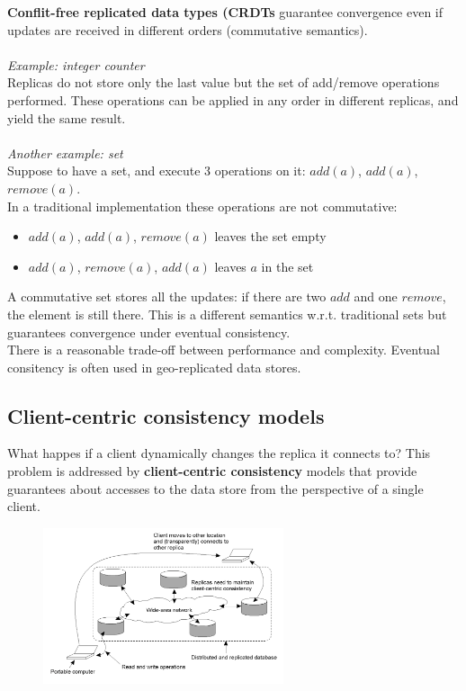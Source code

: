 \documentclass[10pt,a4paper]{article}
\begin{document}
\textbf{Conflit-free replicated data types (CRDTs} guarantee convergence even if updates are received in different orders (commutative semantics). \\ \\
\textit{Example: integer counter} \\
Replicas do not store only the last value but the set of add/remove operations performed. These operations can be applied in any order in different replicas, and yield the same result. \\ \\
\textit{Another example: set} \\
Suppose to have a set, and execute 3 operations on it: $add(a)$, $add(a)$, $remove(a)$. \\
In a traditional implementation these operations are not commutative:
\begin{itemize}
	\item $add(a)$, $add(a)$, $remove(a)$ leaves the set empty
	\item $add(a)$, $remove(a)$, $add(a)$ leaves $a$ in the set
\end{itemize}
A commutative set stores all the updates: if there are two $add$ and one $remove$, the element is still there. This is a different semantics w.r.t. traditional sets but guarantees convergence under eventual consistency. \\
There is a reasonable trade-off between performance and complexity. Eventual consitency is often used in geo-replicated data stores. \pagebreak
\subsection{Client-centric consistency models}
What happes if a client dynamically changes the replica it connects to? This problem is addressed by \textbf{client-centric consistency} models that provide guarantees about accesses to the data store from the perspective of a single client.
\begin{figure}[h!]
 \hfill \includegraphics[width=200pt]{images/client-centric.png}\hspace*{\fill}
  \label{fig:client-centric}
\end{figure}
\end{document}

